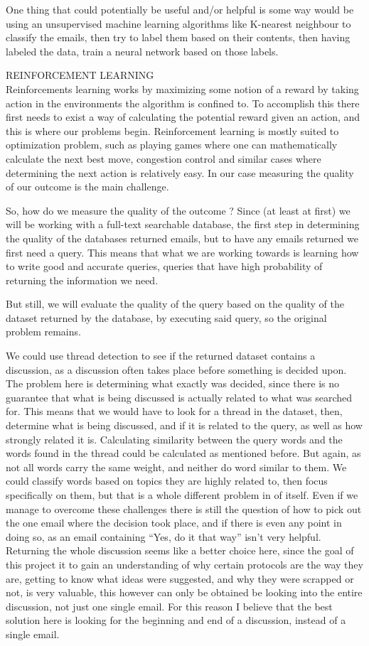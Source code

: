 \documentclass{report}
\begin{document}
One thing that could potentially be useful and/or helpful is some way would be using an unsupervised machine learning algorithms like K-nearest neighbour to classify the emails, then try to label them based on their contents, then having labeled the data, train a neural network based on those labels.

REINFORCEMENT LEARNING\\
Reinforcements learning works by maximizing some notion of a reward by taking action in the environments the algorithm is confined to. To accomplish this there first needs to exist a way of calculating the potential reward given an action, and this is where our problems begin. Reinforcement learning is mostly suited to optimization problem, such as playing games where one can mathematically calculate the next best move, congestion control and similar cases where determining the next action is relatively easy. In our case measuring the quality of our outcome is the main challenge. 

So, how do we measure the quality of the outcome ?
Since (at least at first) we will be working with a full-text searchable database, the first step in determining the quality of the databases returned emails, but to have any emails returned we first need a query. This means that what we are working towards is learning how to write good and accurate queries, queries that have high probability of returning the information we need.

But still, we will evaluate the quality of the query based on the quality of the dataset returned by the database, by executing said query, so the original problem remains.

We could use thread detection to see if the returned dataset contains a discussion, as a discussion often takes place before something is decided upon. The problem here is determining what exactly was decided, since there is no guarantee that what is being discussed is actually related to what was searched for. This means that we would have to look for a thread in the dataset, then, determine what is being discussed, and if it is related to the query, as well as how strongly related it is. Calculating similarity between the query words and the words found in the thread could be calculated as mentioned before. But again, as not all words carry the same weight, and neither do word similar to them. We could classify words based on topics they are highly related to, then focus specifically on them, but that is a whole different problem in of itself.
Even if we manage to overcome these challenges there is still the question of how to pick out the one email where the decision took place, and if there is even any point in doing so, as an email containing “Yes, do it that way” isn't very helpful. Returning the whole discussion seems like a better choice here, since the goal of this project it to gain an understanding of why certain protocols are the way they are, getting to know what ideas were suggested, and why they were scrapped or not, is very valuable, this however can only be obtained be looking into the entire discussion, not just one single email. For this reason I believe that the best solution here is looking for the beginning and end of a discussion, instead of a single email.
\end{document}
